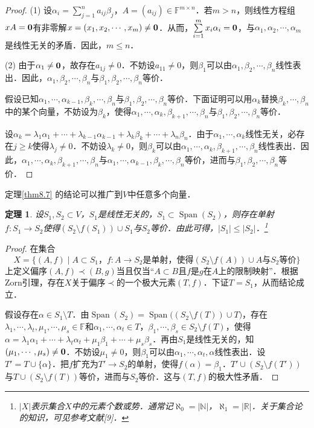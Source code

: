 \documentclass[a4paper,fontset=windows]{ctexbook}
\newtheorem{theorem}{定理}[chapter]
\theoremstyle{definition}
\DeclareMathOperator{\Span}{Span}
\renewcommand{\le}{\leqslant}
\renewcommand{\ge}{\geqslant}
\begin{document}
\begin{proof}
(1) 设$\alpha_i=\sum\limits_{j=1}^na_{ij}\beta_j$，$A=(a_{ij})\in\mathbb{F}^{m\times n}$．若$m>n$，则线性方程组$xA={\bf 0}$有非零解$x=(x_1,x_2,\cdots,x_m)\ne{\bf 0}$．从而，$\sum\limits_{i=1}^mx_i\alpha_i={\bf 0}$，与$\alpha_1,\alpha_2,\cdots,\alpha_m$是线性无关的矛盾．因此，$m\le n$．

(2) 由于$\alpha_1\ne{\bf 0}$，故存在$a_{1j}\ne 0$．不妨设$a_{11}\ne 0$，则$\beta_1$可以由$\alpha_1,\beta_2,\cdots,\beta_n$线性表出．因此，$\alpha_1,\beta_2,\cdots,\beta_n$与$\beta_1,\beta_2,\cdots,\beta_n$等价．

假设已知$\alpha_1,\cdots,\alpha_{k-1},\beta_k,\cdots,\beta_n$与$\beta_1,\beta_2,\cdots,\beta_n$等价．下面证明可以用$\alpha_k$替换$\beta_k,\cdots,\beta_n$中的某个向量，不妨设为$\beta_k$，使得$\alpha_1,\cdots,\alpha_k,\beta_{k+1},\cdots,\beta_n$与$\beta_1,\beta_2,\cdots,\beta_n$等价．

设$\alpha_k=\lambda_1\alpha_1+\cdots+\lambda_{k-1}\alpha_{k-1}+\lambda_k\beta_k+\cdots+\lambda_n\beta_n$．由于$\alpha_1,\cdots,\alpha_k$线性无关，必存在$j\ge k$使得$\lambda_j\ne 0$．不妨设$\lambda_k\ne 0$，则$\beta_k$可以由$\alpha_1,\cdots,\alpha_k,\beta_{k+1},\cdots,\beta_n$线性表出．因此，$\alpha_1,\cdots,\alpha_k,\beta_{k+1},\cdots,\beta_n$与$\alpha_1,\cdots,\alpha_{k-1},\beta_k,\cdots,\beta_n$等价，进而与$\beta_1,\beta_2,\cdots,\beta_n$等价．
\end{proof}

定理\ref{thm8.7} 的结论可以推广到$V$中任意多个向量．

\begin{theorem}\label{thm8.8}
设$S_1,S_2\subset V$，$S_1$是线性无关的，$S_1\subset\Span(S_2)$，则存在单射$f:S_1\to S_2$使得$(S_2\setminus f(S_1))\cup S_1$与$S_2$等价．由此可得，$|S_1|\le|S_2|$．\footnote{$|X|$表示集合$X$中的元素个数或势．通常记$\aleph_0=|\mathbb{N}|$，$\aleph_1=|\mathbb{R}|$．关于集合论的知识，可见参考文献[9]．}
\end{theorem}

\begin{proof}
在集合
$$X=\{(A,f)\mid\text{$A\subset S_1$，$f:A\to S_2$是单射，使得$(S_2\setminus f(A))\cup A$与$S_2$等价}\}$$
上定义偏序$(A,f)\prec(B,g)$当且仅当“$A\subset B$且$f$是$g$在$A$上的限制映射”．根据Zorn引理，存在$X$关于偏序$\prec$的一个极大元素$(T,f)$．下证$T=S_1$，从而结论成立．

假设存在$\alpha\in S_1\setminus T$．由$\Span(S_2)=\Span\bigl((S_2\setminus f(T))\cup T\bigr)$，存在$\lambda_1,\cdots,\lambda_t,\mu_1,\cdots,\mu_s\in\mathbb{F}$和$\alpha_1,\cdots,\alpha_t\in T$，$\beta_1,\cdots,\beta_s\in S_2\setminus f(T)$，使得$\alpha=\lambda_1\alpha_1+\cdots+\lambda_t\alpha_t+\mu_1\beta_1+\cdots+\mu_s\beta_s$．再由$S_1$是线性无关的，知$(\mu_1,\cdots,\mu_s)\ne{\bf 0}$．不妨设$\mu_1\ne 0$，则$\beta_1$可以由$\alpha_1,\cdots,\alpha_t,\alpha$线性表出．设$T'=T\cup\{\alpha\}$．把$f$扩充为$T'\to S_2$的单射，使得$f(\alpha)=\beta_1$．$T'\cup(S_2\setminus f(T'))$与$T\cup(S_2\setminus f(T))$等价，进而与$S_2$等价．这与$(T,f)$的极大性矛盾．
\end{proof}
\end{document}
